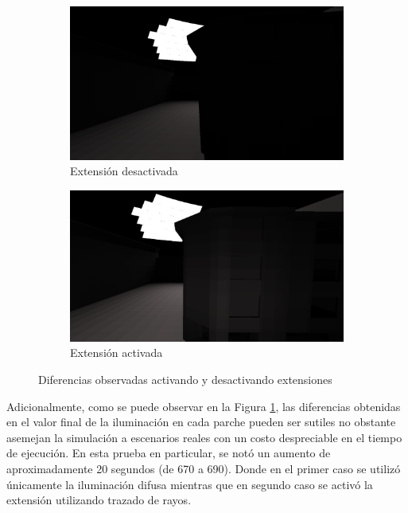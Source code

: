 \begin{figure}[htbp]
	\centering
	\begin{subfigure}{0.47\textwidth}
		\includegraphics[width=1\linewidth]{assets/streete}
		\caption{Extensión desactivada}
	\end{subfigure}
	\begin{subfigure}{0.47\textwidth}
		\includegraphics[width=1\linewidth]{assets/streets}
		\caption{Extensión activada}
	\end{subfigure}
	\caption{Diferencias observadas activando y desactivando extensiones}
	\label{img:difspecstreet}
\end{figure}

Adicionalmente, como se puede observar en la Figura \ref{img:difspecstreet}, las diferencias obtenidas en el valor final de la iluminación en cada parche pueden ser sutiles no obstante asemejan la simulación a escenarios reales con un costo despreciable en el tiempo de ejecución. En esta prueba en particular, se notó un aumento de aproximadamente 20 segundos (de 670 a 690). Donde en el primer caso se utilizó únicamente la iluminación difusa mientras que en segundo caso se activó la extensión utilizando trazado de rayos.

